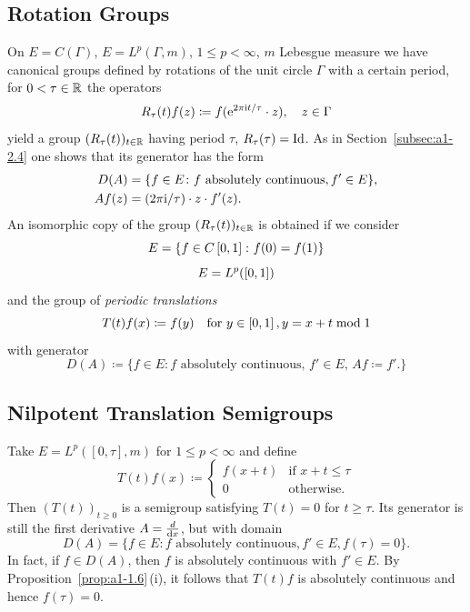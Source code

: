 \subsection{Rotation Groups}\label{subsec:a1-2.5}%
On $E = C(\Gamma)$, \resp $E = L^{p}(\Gamma,m)$, $1 \leq p < \infty$, $m$ Lebesgue measure we have canonical groups defined by rotations of the unit circle $\Gamma$ with a certain period, \ie for $0 < \tau \in \mathbb{R}$ the operators
\[
    R_{\tau}(t)f(z) \coloneq f( \mathrm{e}^{2\pi \mathrm{i} t/\tau}\cdot z), \quad z \in \Gamma
\]
yield a group $(R_{\tau}(t))_{t \in \mathbb{R}}$ having period $\tau$, \ie $R_{\tau}(\tau) = \operatorname{Id}$.
As in Section~\ref{subsec:a1-2.4} one shows that its generator has the form
\begin{align*}
    D(A) &= \{f \in E \colon f \text{ absolutely continuous}, f' \in E\}, \\
    Af(z)&= (2\pi \mathrm{i}/\tau) \cdot z \cdot f'(z).
\end{align*}
An isomorphic copy of the group $(R_{\tau}(t))_{t \in \mathbb{R}}$ is obtained if we consider 
\[
E = \{f \in C\left[ 0,1 \right] \colon f(0) = f(1)\}
\]
\resp 
\[
E = L^{p}(\left[ 0,1 \right])
\]
and the group of \emph{periodic translations}
\[
    T(t)f(x) \coloneq f(y) \quad \text{for $y \in \left[ 0,1 \right], y = x+t \bmod 1$} 
\]
with generator
\[
    D(A) \coloneq \{f \in E \colon f \text{ absolutely continuous, $f' \in E$, $Af \coloneq f'$}. \}
\]
\subsection{Nilpotent Translation Semigroups}\label{subsec:a1-2.6}%
Take $E = L^{p}([0,\tau],m)$ for $1 \leq p < \infty$ and define
\[
    T(t)f(x) \coloneq \begin{cases}
        f(x+t) & \text{if } x+t \leq \tau \\
        0 & \text{otherwise.}
    \end{cases}
\]
Then $(T(t))_{t\geq 0}$ is a semigroup satisfying $T(t) = 0$ for $t \geq \tau$.
Its generator is still the first derivative $A = \frac{d}{\mathop{}\!\mathrm{d}{x}}$, but with domain 
\[
D(A) = \{f \in E \colon f \text{ absolutely continuous}, f' \in E, f(\tau) = 0\}.
\]
In fact, if\/ $f \in D(A)$, then $f$ is absolutely continuous with $f' \in E$.
By Proposition~\ref{prop:a1-1.6}\,(i), it follows that $T(t)f$ is absolutely continuous and hence $f(\tau) = 0$.
